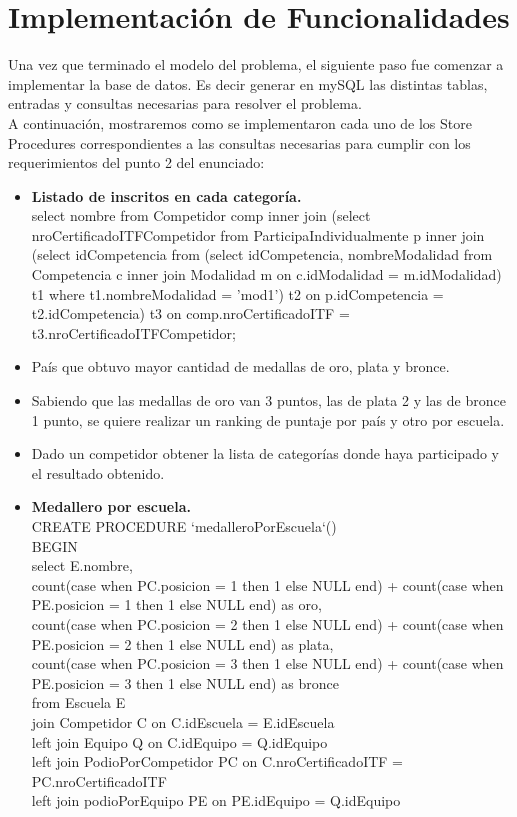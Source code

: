 \section{Implementación  de Funcionalidades}

Una vez que terminado el modelo del problema, el siguiente paso fue comenzar a implementar la base de datos. Es decir generar en mySQL las distintas tablas, entradas y consultas necesarias para resolver el problema.\\

A continuación, mostraremos como se implementaron cada uno de los Store Procedures correspondientes a las consultas necesarias para cumplir con los requerimientos del punto 2 del enunciado:\\

\begin{itemize}
\item{\textbf{Listado de inscritos en cada categoría.}\\
select nombre from Competidor comp inner join 
(select nroCertificadoITFCompetidor 
from ParticipaIndividualmente p 
inner join (select idCompetencia from (select idCompetencia, nombreModalidad from Competencia c
inner join Modalidad m on c.idModalidad = m.idModalidad) t1 where t1.nombreModalidad = 'mod1') t2
on p.idCompetencia = t2.idCompetencia) t3 
on comp.nroCertificadoITF = t3.nroCertificadoITFCompetidor;

}

\item País que obtuvo mayor cantidad de medallas de oro, plata y bronce.
\item Sabiendo que las medallas de oro van 3 puntos, las de plata 2 y las de bronce 1 punto, se quiere realizar un ranking de puntaje por país y otro por escuela.
\item Dado un competidor obtener la lista de categorías donde haya participado y el resultado obtenido.

\item{ \textbf{Medallero por escuela.}\\
CREATE PROCEDURE `medalleroPorEscuela`()\\
BEGIN\\
select E.nombre,\\
	count(case when PC.posicion = 1 then 1 else NULL end) + count(case when PE.posicion = 1 then 1 else NULL end) as oro, \\
	count(case when PC.posicion = 2 then 1 else NULL end) + count(case when PE.posicion = 2 then 1 else NULL end) as plata,  \\
    count(case when PC.posicion = 3 then 1 else NULL end) + count(case when PE.posicion = 3 then 1 else NULL end) as bronce\\
    from Escuela E\\
		join Competidor C on C.idEscuela = E.idEscuela\\
		left join Equipo Q on C.idEquipo = Q.idEquipo\\
		left join PodioPorCompetidor PC on C.nroCertificadoITF = PC.nroCertificadoITF\\
		left join podioPorEquipo PE on PE.idEquipo = Q.idEquipo\\
		
}
\end{itemize}
